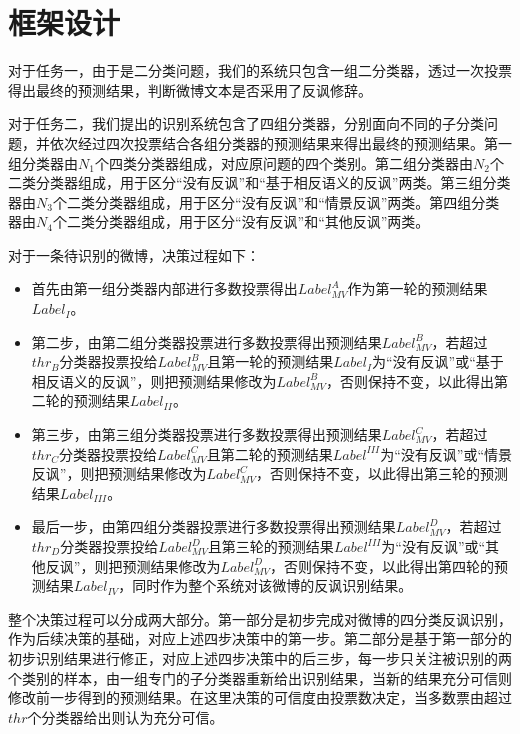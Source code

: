 \section{框架设计}
\label{sec:exp_irony_det_framework}

对于任务一，由于是二分类问题，我们的系统只包含一组二分类器，透过一次投票得出最终的预测结果，判断微博文本是否采用了反讽修辞。

对于任务二，我们提出的识别系统包含了四组分类器，分别面向不同的子分类问题，并依次经过四次投票结合各组分类器的预测结果来得出最终的预测结果。第一组分类器由$N_1$个四类分类器组成，对应原问题的四个类别。第二组分类器由$N_2$个二类分类器组成，用于区分“没有反讽”和“基于相反语义的反讽”两类。第三组分类器由$N_3$个二类分类器组成，用于区分“没有反讽”和“情景反讽”两类。第四组分类器由$N_4$个二类分类器组成，用于区分“没有反讽”和“其他反讽”两类。

对于一条待识别的微博，决策过程如下：

\begin{itemize}

\item 首先由第一组分类器内部进行多数投票得出$Label^{A}_{MV}$作为第一轮的预测结果$Label_{I}$。

\item 第二步，由第二组分类器投票进行多数投票得出预测结果$Label^{B}_{MV}$，若超过$thr_{B}$分类器投票投给$Label^{B}_{MV}$且第一轮的预测结果$Label_{I}$为“没有反讽”或“基于相反语义的反讽”，则把预测结果修改为$Label^{B}_{MV}$，否则保持不变，以此得出第二轮的预测结果$Label_{II}$。

\item 第三步，由第三组分类器投票进行多数投票得出预测结果$Label^{C}_{MV}$，若超过$thr_{C}$分类器投票投给$Label^{C}_{MV}$且第二轮的预测结果$Label^{III}$为“没有反讽”或“情景反讽”，则把预测结果修改为$Label^{C}_{MV}$，否则保持不变，以此得出第三轮的预测结果$Label_{III}$。

\item 最后一步，由第四组分类器投票进行多数投票得出预测结果$Label^{D}_{MV}$，若超过$thr_{D}$分类器投票投给$Label^{D}_{MV}$且第三轮的预测结果$Label^{III}$为“没有反讽”或“其他反讽”，则把预测结果修改为$Label^{D}_{MV}$，否则保持不变，以此得出第四轮的预测结果$Label_{IV}$，同时作为整个系统对该微博的反讽识别结果。

\end{itemize}

整个决策过程可以分成两大部分。第一部分是初步完成对微博的四分类反讽识别，作为后续决策的基础，对应上述四步决策中的第一步。第二部分是基于第一部分的初步识别结果进行修正，对应上述四步决策中的后三步，每一步只关注被识别的两个类别的样本，由一组专门的子分类器重新给出识别结果，当新的结果充分可信则修改前一步得到的预测结果。在这里决策的可信度由投票数决定，当多数票由超过$thr$个分类器给出则认为充分可信。

